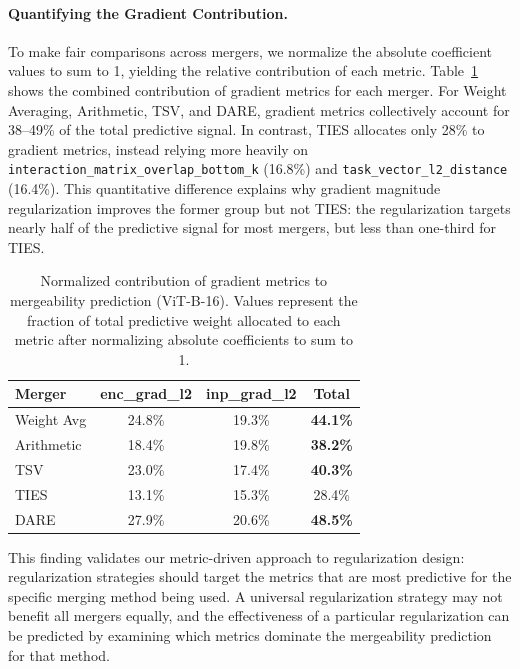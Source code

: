 \paragraph{Quantifying the Gradient Contribution.}
To make fair comparisons across mergers, we normalize the absolute coefficient values to sum to 1, yielding the relative contribution of each metric. Table~\ref{tab:gradient_contribution} shows the combined contribution of gradient metrics for each merger. For Weight Averaging, Arithmetic, TSV, and DARE, gradient metrics collectively account for 38--49\% of the total predictive signal. In contrast, TIES allocates only 28\% to gradient metrics, instead relying more heavily on \texttt{interaction\_matrix\_overlap\_bottom\_k} (16.8\%) and \texttt{task\_vector\_l2\_distance} (16.4\%). This quantitative difference explains why gradient magnitude regularization improves the former group but not TIES: the regularization targets nearly half of the predictive signal for most mergers, but less than one-third for TIES.

\begin{table}[h]
\centering
\caption{Normalized contribution of gradient metrics to mergeability prediction (ViT-B-16). Values represent the fraction of total predictive weight allocated to each metric after normalizing absolute coefficients to sum to 1.}
\label{tab:gradient_contribution}
\begin{tabular}{lccc}
\toprule
\textbf{Merger} & \textbf{enc\_grad\_l2} & \textbf{inp\_grad\_l2} & \textbf{Total} \\
\midrule
Weight Avg & 24.8\% & 19.3\% & \textbf{44.1\%} \\
Arithmetic & 18.4\% & 19.8\% & \textbf{38.2\%} \\
TSV & 23.0\% & 17.4\% & \textbf{40.3\%} \\
TIES & 13.1\% & 15.3\% & 28.4\% \\
DARE & 27.9\% & 20.6\% & \textbf{48.5\%} \\
\bottomrule
\end{tabular}
\end{table}

This finding validates our metric-driven approach to regularization design: regularization strategies should target the metrics that are most predictive for the specific merging method being used. A universal regularization strategy may not benefit all mergers equally, and the effectiveness of a particular regularization can be predicted by examining which metrics dominate the mergeability prediction for that method.

